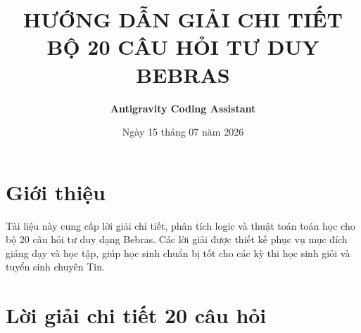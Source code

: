 \documentclass[11pt,a4paper]{article}
\title{\textbf{HƯỚNG DẪN GIẢI CHI TIẾT BỘ 20 CÂU HỎI TƯ DUY BEBRAS}}
\author{\textbf{Antigravity Coding Assistant}}
\date{Ngày 15 tháng 07 năm 2026}
\begin{document}
\maketitle

\tableofcontents
\newpage

\section{Giới thiệu}
Tài liệu này cung cấp lời giải chi tiết, phân tích logic và thuật toán toán học cho bộ 20 câu hỏi tư duy dạng Bebras. Các lời giải được thiết kế phục vụ mục đích giảng dạy và học tập, giúp học sinh chuẩn bị tốt cho các kỳ thi học sinh giỏi và tuyển sinh chuyên Tin.

\section{Lời giải chi tiết 20 câu hỏi}
\end{document}

